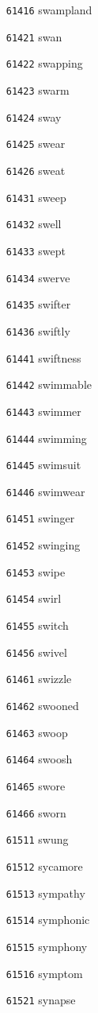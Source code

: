 \documentclass[twoside,11pt]{article}
\begin{document}
\begin{multicols}{5}
\begin{enumerate}
\item[\texttt{61416}] swampland
\item[\texttt{61421}] swan
\item[\texttt{61422}] swapping
\item[\texttt{61423}] swarm
\item[\texttt{61424}] sway
\item[\texttt{61425}] swear
\item[\texttt{61426}] sweat
\item[\texttt{61431}] sweep
\item[\texttt{61432}] swell
\item[\texttt{61433}] swept
\item[\texttt{61434}] swerve
\item[\texttt{61435}] swifter
\item[\texttt{61436}] swiftly
\item[\texttt{61441}] swiftness
\item[\texttt{61442}] swimmable
\item[\texttt{61443}] swimmer
\item[\texttt{61444}] swimming
\item[\texttt{61445}] swimsuit
\item[\texttt{61446}] swimwear
\item[\texttt{61451}] swinger
\item[\texttt{61452}] swinging
\item[\texttt{61453}] swipe
\item[\texttt{61454}] swirl
\item[\texttt{61455}] switch
\item[\texttt{61456}] swivel
\item[\texttt{61461}] swizzle
\item[\texttt{61462}] swooned
\item[\texttt{61463}] swoop
\item[\texttt{61464}] swoosh
\item[\texttt{61465}] swore
\item[\texttt{61466}] sworn
\item[\texttt{61511}] swung
\item[\texttt{61512}] sycamore
\item[\texttt{61513}] sympathy
\item[\texttt{61514}] symphonic
\item[\texttt{61515}] symphony
\item[\texttt{61516}] symptom
\item[\texttt{61521}] synapse

\end{enumerate}
\end{multicols}
\end{document}
